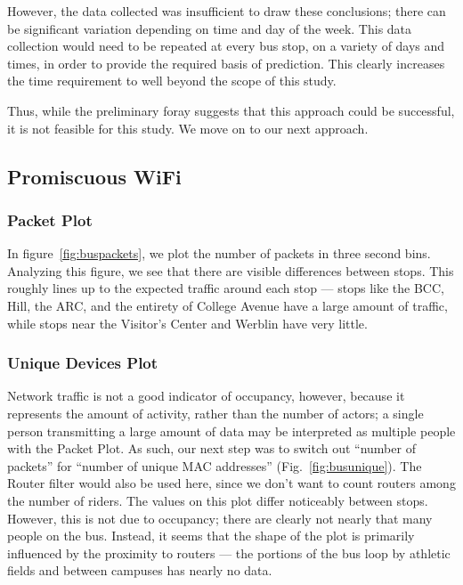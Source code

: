 However, the data collected was insufficient to draw these conclusions; there can be significant variation depending on time and day of the week.
This data collection would need to be repeated at every bus stop, on a variety of days and times, in order to provide the required basis of prediction.
This clearly increases the time requirement to well beyond the scope of this study.
	
Thus, while the preliminary foray suggests that this approach could be successful, it is not feasible for this study.
We move on to our next approach.

\subsection{Promiscuous WiFi}
    
\subsubsection*{Packet Plot}

In figure~\ref{fig:buspackets}, we plot the number of packets in three second bins.
Analyzing this figure, we see that there are visible differences between stops.
This roughly lines up to the expected traffic around each stop --- stops like the BCC, Hill, the ARC, and the entirety of College Avenue have a large amount of traffic, while stops near the Visitor's Center and Werblin have very little.

\subsubsection*{Unique Devices Plot}

Network traffic is not a good indicator of occupancy, however, because it represents the amount of activity, rather than the number of actors; a single person transmitting a large amount of data may be interpreted as multiple people with the Packet Plot.
As such, our next step was to switch out ``number of packets'' for ``number of unique MAC addresses'' (Fig.~\ref{fig:busunique}).
The Router filter would also be used here, since we don't want to count routers among the number of riders.
The values on this plot differ noticeably between stops.
However, this is not due to occupancy; there are clearly not nearly that many people on the bus.
Instead, it seems that the shape of the plot is primarily influenced by the proximity to routers --- the portions of the bus loop by athletic fields and between campuses has nearly no data.

